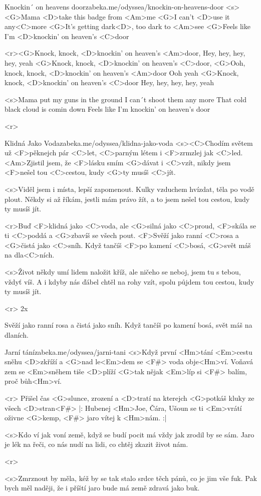 \begin{song}{7}{Knockin´ on heavens door}{zabeka.me/odyssea/knockin-on-heavens-door}
<s><G>Mama <D>take this badge from <Am>me
<G>I can't <D>use it any<C>more
<G>It's getting dark<D>, too dark to <Am>see
<G>Feels like I'm <D>knockin' on heaven's <C>door

<r><G>Knock, knock, <D>knockin' on heaven's <Am>door,
Hey, hey, hey, hey, yeah
<G>Knock, knock, <D>knockin' on heaven's <C>door,
<G>Ooh, knock, knock, <D>knockin' on heaven's <Am>door
Ooh yeah
<G>Knock, knock, <D>knockin' on heaven's <C>door
Hey, hey, hey, hey, yeah

<s>Mama put my guns in the ground
I can´t shoot them any more
That cold black cloud is comin down
Feels like I'm knockin' on heaven's door

<r>
\end{song}
\begin{song}[Jelen]{8}{Klidná Jako Voda}{zabeka.me/odyssea/klidna-jako-voda}
<s><C>Chodím světem už <F>pěknejch pár <C>let,
<C>parným létem i <F>zrmzlej jak <C>led.
<Am>Zjistil jsem, že <F>lásku smím <G>dávat i <C>vzít,
nikdy jsem <F>nešel tou <C>cestou, kudy <G>ty musíš <C>jít.

<s>Viděl jsem i místa, lepší zapomenout.
Kulky vzduchem hvízdat, těla po vodě plout.
Někdy si až říkám, jestli mám právo žít,
a to jsem nešel tou cestou, kudy ty musíš jít.

<r>Buď <F>klidná jako <C>voda, ale <G>silná jako <C>proud,
<F>skála se ti <C>poddá a <G>zbavíš se všech pout.
<F>Svěží jako ranní <C>rosa a <G>čistá jako <C>sníh.
Když tančíš <F>po kamení <C>bosá, <G>svět máš na dla<C>ních.

<s>Život někdy umí lidem naložit kříž,
ale ničeho se neboj, jsem tu s tebou, vždyť víš.
A i kdyby nás ďábel chtěl na rohy vzít,
spolu půjdem tou cestou, kudy ty musíš jít.

<r>
2x

Svěží jako ranní rosa a čistá jako sníh.
Když tančíš po kamení bosá, svět máš na dlaních. 

\end{song}
\begin{song}[Brontosauři]{9}{Jarní tání}{zabeka.me/odyssea/jarni-tani}
<s>Když první <Hm>tání <Em>cestu sněhu <D>zkříží
a <G>nad le<Em>dem se <F#> voda obje<Hm>ví.
Voňavá zem se <Em>sněhem tiše <D>plíží
<G>tak nějak <Em>líp si <F#> balím, proč bůh<Hm>ví.


<r> Přišel čas <G>slunce, zrození a <D>tratí
na kterejch <G>potkáš kluky ze všech <D>stran<F#>
|: Hubenej <Hm>Joe, Čára, Ušoun se ti <Em>vrátí
oživne <G>kemp, <F#> jaro vítej k <Hm>nám. :|


<s>Kdo ví jak voní země, když se budí
pocit má vždy jak zrodil by se sám.
Jaro je lék na řeči, co nás nudí
na lidi, co chtěj zkazit život nám.

<r>

<s>Zmrznout by měla, kéž by se tak stalo
srdce těch pánů, co je jim vše fuk.
Pak bych měl naději, že i příští jaro
bude má země zdravá jako buk. 
\end{song}
